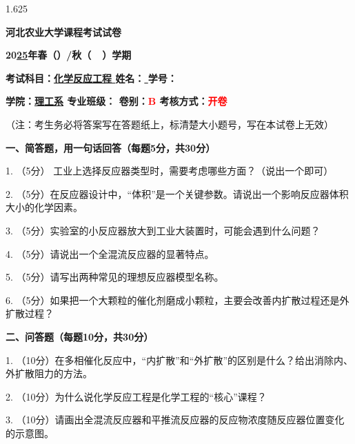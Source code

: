 \documentclass[12pt, b5paper]{article}
\newcommand*{\cred}{\textcolor{red}}
\begin{document}
\begin{spacing}{1.625}

\centerline{{\huge \bf{河北农业大学课程考试试卷}}}

\centerline{\bf{\large 20\underline{25}年春（\quad ）/秋（\ \surd \ ）学期}}

{\bf{考试科目：\underline{\quad 化学反应工程 \quad} \hfill 姓名：\underline{ \qquad \qquad} \hfill 学号：\underline{ \qquad \qquad \qquad \qquad}}}

{\bf{学院：\underline{\quad 理工系\quad } \hfill 专业班级：\underline{\qquad \qquad \qquad \qquad} \hfill 卷别：\cred{B} \hfill 考核方式：\cred{开卷}}}

（注：考生务必将答案写在答题纸上，标清楚大小题号，写在本试卷上无效）

\bigskip


{\bf{一、简答题，用一句话回答（每题5分，共30分）}}

1. （5分） 工业上选择反应器类型时，需要考虑哪些方面？（说出一个即可）

\bigskip

2. （5分）在反应器设计中，“体积”是一个关键参数。请说出一个影响反应器体积大小的化学因素。

\bigskip

3. （5分）实验室的小反应器放大到工业大装置时，可能会遇到什么问题？

\bigskip

4. （5分）请说出一个全混流反应器的显著特点。

\bigskip

5. （5分）请写出两种常见的理想反应器模型名称。

\bigskip

6. （5分）如果把一个大颗粒的催化剂磨成小颗粒，主要会改善内扩散过程还是外扩散过程？

\bigskip

{\bf{二、问答题（每题10分，共30分）}}

1. （10分）在多相催化反应中，“内扩散”和“外扩散”的区别是什么？给出消除内、外扩散阻力的方法。

\bigskip

2. （10分）为什么说化学反应工程是化学工程的“核心”课程？

\bigskip

3. （10分）请画出全混流反应器和平推流反应器的反应物浓度随反应器位置变化的示意图。

\end{spacing}
\end{document}
